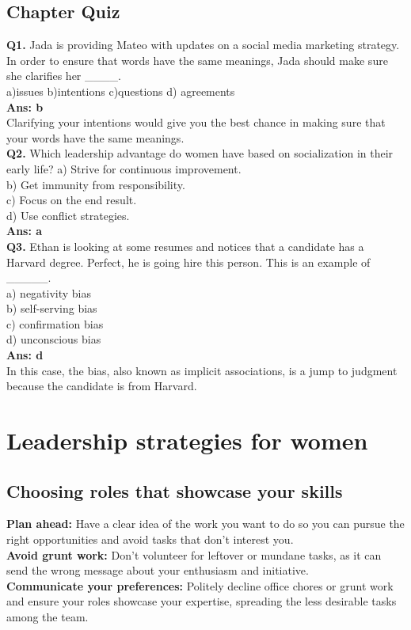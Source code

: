 \documentclass[12pt]{article}
\begin{document}
\subsection{Chapter Quiz}
\textbf{Q1.}  Jada is providing Mateo with updates on a social media marketing strategy. In order to ensure that words have the same meanings, Jada should make sure she clarifies her \_\_\_\_.\\
a)issues b)intentions c)questions d) agreements\\
\textbf{Ans: b}\\
Clarifying your intentions would give you the best chance in making sure that your words have the same meanings.\\
\textbf{Q2.} Which leadership advantage do women have based on socialization in their early life?
a) Strive for continuous improvement.\\
b) Get immunity from responsibility.\\
c) Focus on the end result.\\
d) Use conflict strategies.\\
\textbf{Ans: a}\\
\textbf{Q3.} Ethan is looking at some resumes and notices that a candidate has a Harvard degree. Perfect, he is going hire this person. This is an example of \_\_\_\_\_.\\
a) negativity bias \\
b) self-serving bias \\
c) confirmation bias\\
d) unconscious bias\\
\textbf{Ans: d}\\
In this case, the bias, also known as implicit associations, is a jump to judgment because the candidate is from Harvard.

\section{  Leadership strategies for women}
\subsection{Choosing roles that showcase your skills}
\textbf{Plan ahead:} Have a clear idea of the work you want to do so you can pursue the right opportunities and avoid tasks that don't interest you.\\
\textbf{Avoid grunt work:} Don't volunteer for leftover or mundane tasks, as it can send the wrong message about your enthusiasm and initiative.\\
\textbf{Communicate your preferences:} Politely decline office chores or grunt work and ensure your roles showcase your expertise, spreading the less desirable tasks among the team.
\end{document}
